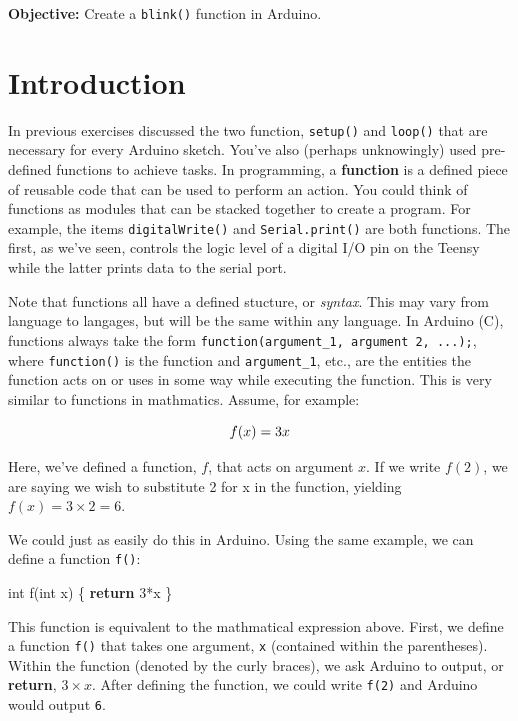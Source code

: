\documentclass[]{book}
\newenvironment{Shaded}{\begin{snugshade}}{\end{snugshade}}
\newcommand{\ControlFlowTok}[1]{\textcolor[rgb]{0.13,0.29,0.53}{\textbf{#1}}}
\newcommand{\DataTypeTok}[1]{\textcolor[rgb]{0.13,0.29,0.53}{#1}}
\newcommand{\DecValTok}[1]{\textcolor[rgb]{0.00,0.00,0.81}{#1}}
\newcommand{\NormalTok}[1]{#1}
\begin{document}
\textbf{Objective:} Create a \texttt{blink()} function in Arduino.

\hypertarget{introduction-3}{%
\section*{Introduction}\label{introduction-3}}

In previous exercises discussed the two function, \texttt{setup()} and \texttt{loop()} that are necessary for every Arduino sketch. You've also (perhaps unknowingly) used pre-defined functions to achieve tasks. In programming, a \textbf{function} is a defined piece of reusable code that can be used to perform an action. You could think of functions as modules that can be stacked together to create a program. For example, the items \texttt{digitalWrite()} and \texttt{Serial.print()} are both functions. The first, as we've seen, controls the logic level of a digital I/O pin on the Teensy while the latter prints data to the serial port.

Note that functions all have a defined stucture, or \emph{syntax}. This may vary from language to langages, but will be the same within any language. In Arduino (C), functions always take the form \texttt{function(argument\_1,\ argument\ 2,\ ...);}, where \texttt{function()} is the function and \texttt{argument\_1}, etc., are the entities the function acts on or uses in some way while executing the function. This is very similar to functions in mathmatics. Assume, for example:

\[
f(x) = 3x \\
\]

Here, we've defined a function, \(f\), that acts on argument \(x\). If we write \(f(2)\), we are saying we wish to substitute 2 for x in the function, yielding \(f(x) = 3 \times 2 = 6\).

We could just as easily do this in Arduino. Using the same example, we can define a function \texttt{f()}:

\begin{Shaded}
\begin{Highlighting}[]
  \DataTypeTok{int}\NormalTok{ f(}\DataTypeTok{int}\NormalTok{ x) \{}
    \ControlFlowTok{return} \DecValTok{3}\NormalTok{*x}
\NormalTok{  \}}
\end{Highlighting}
\end{Shaded}

This function is equivalent to the mathmatical expression above. First, we define a function \texttt{f()} that takes one argument, \texttt{x} (contained within the parentheses). Within the function (denoted by the curly braces), we ask Arduino to output, or \textbf{return}, \(3 \times x\). After defining the function, we could write \texttt{f(2)} and Arduino would output \texttt{6}.
\end{document}

